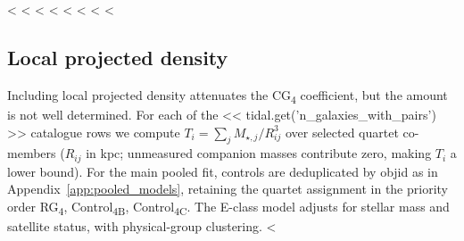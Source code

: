 \documentclass{aa}
\newcommand{\CB}{Control\textsubscript{4B}}
\newcommand{\CC}{Control\textsubscript{4C}}
\newcommand{\CG}{CG\textsubscript{4}}
\newcommand{\RG}{RG\textsubscript{4}}
\begin{document}
<%
<%
<%
<%
<%
<%
<%
<%
\subsection{Local projected density}\label{sec:tidal_index}

Including local projected density attenuates the \CG{} coefficient, but the amount is not well determined. For each of the << tidal.get('n_galaxies_with_pairs') >> catalogue rows we compute \(T_i = \sum_j M_{\star,j}/R_{ij}^3\) over selected quartet co-members (\(R_{ij}\) in kpc; unmeasured companion masses contribute zero, making \(T_i\) a lower bound). For the main pooled fit, controls are deduplicated by objid as in Appendix~\ref{app:pooled_models}, retaining the quartet assignment in the priority order \RG{}, \CB{}, \CC{}. The E-class model adjusts for stellar mass and satellite status, with physical-group clustering. <%
\end{document}
